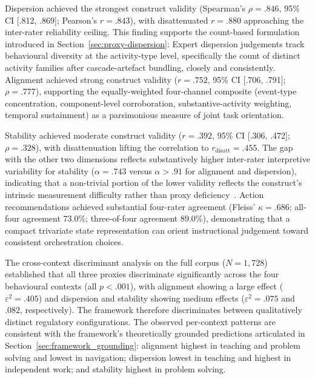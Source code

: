 \documentclass[preprint,12pt,authoryear]{elsarticle}
\begin{document}
Dispersion achieved the strongest construct validity (Spearman's $\rho = .846$, 95\% CI [.812, .869]; Pearson's $r = .843$), with disattenuated $r = .880$ approaching the inter-rater reliability ceiling. This finding supports the count-based formulation introduced in Section~\ref{sec:proxy-dispersion}: Expert dispersion judgements track behavioural diversity at the activity-type level, specifically the count of distinct activity families after cascade-artefact bundling, closely and consistently. Alignment achieved strong construct validity ($r = .752$, 95\% CI [.706, .791]; $\rho = .777$), supporting the equally-weighted four-channel composite (event-type concentration, component-level corroboration, substantive-activity weighting, temporal sustainment) as a parsimonious measure of joint task orientation.

Stability achieved moderate construct validity ($r = .392$, 95\% CI [.306, .472]; $\rho = .328$), with disattenuation lifting the correlation to $r_{\mathrm{disatt}} = .455$. The gap with the other two dimensions reflects substantively higher inter-rater interpretive variability for stability ($\alpha = .743$ versus $\alpha > .91$ for alignment and dispersion), indicating that a non-trivial portion of the lower validity reflects the construct's intrinsic measurement difficulty rather than proxy deficiency~\citep{winne2020, kane2013}. Action recommendations achieved substantial four-rater agreement (Fleiss' $\kappa = .686$; all-four agreement $73.0\%$; three-of-four agreement $89.0\%$), demonstrating that a compact trivariate state representation can orient instructional judgement toward consistent orchestration choices.

The cross-context discriminant analysis on the full corpus ($N = 1{,}728$) established that all three proxies discriminate significantly across the four behavioural contexts (all $p < .001$), with alignment showing a large effect ($\varepsilon^2 = .405$) and dispersion and stability showing medium effects ($\varepsilon^2 = .075$ and $.082$, respectively). The framework therefore discriminates between qualitatively distinct regulatory configurations. The observed per-context patterns are consistent with the framework's theoretically grounded predictions articulated in Section~\ref{sec:framework_grounding}: alignment highest in teaching and problem solving and lowest in navigation; dispersion lowest in teaching and highest in independent work; and stability highest in problem solving.

\end{document}
